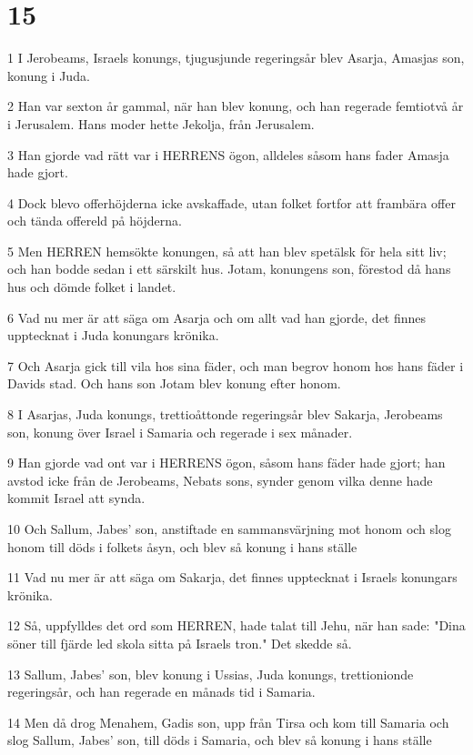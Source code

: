 \chapter{15}

\par 1 I Jerobeams, Israels konungs, tjugusjunde regeringsår blev Asarja, Amasjas son, konung i Juda.
\par 2 Han var sexton år gammal, när han blev konung, och han regerade femtiotvå år i Jerusalem. Hans moder hette Jekolja, från Jerusalem.
\par 3 Han gjorde vad rätt var i HERRENS ögon, alldeles såsom hans fader Amasja hade gjort.
\par 4 Dock blevo offerhöjderna icke avskaffade, utan folket fortfor att frambära offer och tända offereld på höjderna.
\par 5 Men HERREN hemsökte konungen, så att han blev spetälsk för hela sitt liv; och han bodde sedan i ett särskilt hus. Jotam, konungens son, förestod då hans hus och dömde folket i landet.
\par 6 Vad nu mer är att säga om Asarja och om allt vad han gjorde, det finnes upptecknat i Juda konungars krönika.
\par 7 Och Asarja gick till vila hos sina fäder, och man begrov honom hos hans fäder i Davids stad. Och hans son Jotam blev konung efter honom.
\par 8 I Asarjas, Juda konungs, trettioåttonde regeringsår blev Sakarja, Jerobeams son, konung över Israel i Samaria och regerade i sex månader.
\par 9 Han gjorde vad ont var i HERRENS ögon, såsom hans fäder hade gjort; han avstod icke från de Jerobeams, Nebats sons, synder genom vilka denne hade kommit Israel att synda.
\par 10 Och Sallum, Jabes' son, anstiftade en sammansvärjning mot honom och slog honom till döds i folkets åsyn, och blev så konung i hans ställe
\par 11 Vad nu mer är att säga om Sakarja, det finnes upptecknat i Israels konungars krönika.
\par 12 Så, uppfylldes det ord som HERREN, hade talat till Jehu, när han sade: "Dina söner till fjärde led skola sitta på Israels tron." Det skedde så.
\par 13 Sallum, Jabes' son, blev konung i Ussias, Juda konungs, trettionionde regeringsår, och han regerade en månads tid i Samaria.
\par 14 Men då drog Menahem, Gadis son, upp från Tirsa och kom till Samaria och slog Sallum, Jabes' son, till döds i Samaria, och blev så konung i hans ställe
